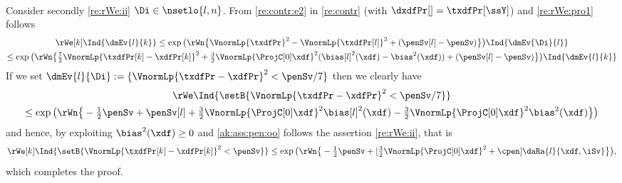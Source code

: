 \begin{pro}
\begin{multline*}
  \end{multline*}
  Consider secondly \ref{re:rWe:ii} $\Di\in\nsetlo{l,n}$. From \ref{re:contr:e2}
  in \cref{re:contr} (with $\dxdfPr[]=\txdfPr[\ssY]$) and
  \eqref{re:rWe:pro1} follows
  \begin{multline*}
    \rWe[k]\Ind{\dmEv{l}{k}}
    \leq\exp\big(\rWn\big\{\VnormLp{\txdfPr}^2-\VnormLp{\txdfPr[l]}^2
    +(\penSv[l]-\penSv)\big\}\big)\Ind{\dmEv{\Di}{l}}\\
    \leq
    \exp\big(\rWn\big\{\tfrac{7}{2}\VnormLp{\txdfPr[k]-\xdfPr[k]}^2
    +\tfrac{3}{2}\VnormLp{\ProjC[0]\xdf}^2(\bias[l]^2(\xdf)-\bias^2(\xdf))
    +(\penSv[l]-\penSv)\big\}\big)\Ind{\dmEv{l}{k}}
  \end{multline*}
  If we set $\dmEv{l}{\Di}:=\{\VnormLp{\txdfPr-\xdfPr}^2<\penSv/7\}$
  then we clearly have
  \begin{multline*}
    \rWe\Ind{\setB{\VnormLp{\txdfPr-\xdfPr}^2<\penSv/7}}\\
    \leq \exp\big(\rWn\big\{-\tfrac{1}{2}\penSv+\penSv[l]+
    \tfrac{3}{2}\VnormLp{\ProjC[0]\xdf}^2\bias[l]^2(\xdf)
    -\tfrac{3}{2}\VnormLp{\ProjC[0]\xdf}^2\bias^2(\xdf)\big\}\big)
  \end{multline*}
  and hence, by exploiting $\bias^2(\xdf)\geq0$ and
  \ref{ak:ass:pen:oo} follows the assertion \ref{re:rWe:ii}, that is
  \begin{equation*}
    \rWe[k]\Ind{\setB{\VnormLp{\txdfPr[k]-\xdfPr[k]}^2<\penSv}}
    \leq \exp\big(\rWn\big\{-\tfrac{1}{2}\penSv+[\tfrac{3}{2}\VnormLp{\ProjC[0]\xdf}^2+\cpen]\daRa{l}{\xdf,\iSv}\big\}\big),
 \end{equation*}
which completes the proof.\proEnd
\end{pro}
